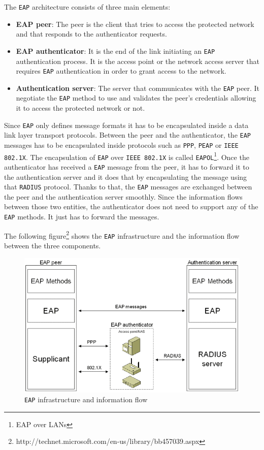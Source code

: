 The \texttt{EAP} architecture consists of three main elements:
\begin{itemize}
	\item \textbf{EAP peer}: The peer is the client that tries to access the protected network and that responds to the authenticator requests.
	\item \textbf{EAP authenticator}: It is the end of the link initiating an \texttt{EAP} authentication process. It is the access point or the network access server that requires \texttt{EAP} authentication in order to grant access to the network.
	\item \textbf{Authentication server}: The server that communicates with the \texttt{EAP} peer. It negotiate the \texttt{EAP} method to use and validates the peer's credentials allowing it to access the protected network or not.
\end{itemize}

Since \texttt{EAP} only defines message formats it has to be encapsulated inside a data link layer transport protocols. Between the peer and the authenticator, the \texttt{EAP} messages has to be encapsulated inside protocols such as \texttt{PPP}, \texttt{PEAP} or \texttt{IEEE 802.1X}. The encapsulation of \texttt{EAP} over \texttt{IEEE 802.1X} is called \texttt{EAPOL}\footnote{EAP over LANs}. Once the authenticator has received a \texttt{EAP} message from the peer, it has to forward it to the authentication server and it does that by encapsulating the message using that \texttt{RADIUS} protocol. Thanks to that, the \texttt{EAP} messages are exchanged between the peer and the authentication server smoothly. Since the information flows between those two entities, the authenticator does not need to support any of the \texttt{EAP} methods. It just has to forward the messages.

The following figure\footnote{http://technet.microsoft.com/en-us/library/bb457039.aspx} shows the \texttt{EAP} infrastructure and the information flow between the three components.

\begin{figure}[H]
	\center
	\includegraphics[width=0.7\linewidth]{Pictures/chapter2/eap.png}
	\caption{\texttt{EAP} infrastructure and information flow}
\end{figure}

